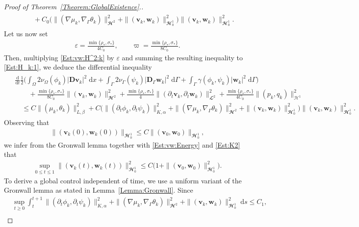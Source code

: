 \documentclass[10pt,reqno]{amsart}
\theoremstyle{remark}
\numberwithin{equation}{section}
\newcommand{\abs}[1]{| #1 |}
\newcommand{\norm}[1]{\| #1 \|}
\newcommand{\bv}{\mathbf{v}}
\newcommand{\bw}{\mathbf{w}}
\newcommand{\D}{\mathbf{D}}
\newcommand{\Dg}{\mathbf{D}_\Gamma}
\newcommand{\intO}{\int_\Omega}
\newcommand{\intG}{\int_\Gamma}
\newcommand{\dx}{\;\mathrm{d}x}
\newcommand{\ds}{\;\mathrm ds}
\newcommand{\dG}{\;\mathrm d\Ga}
\newcommand{\ddt}{\frac{\mathrm d}{\mathrm dt}}
\newcommand{\delt}{\partial_{t}}
\newcommand{\Grad}{\nabla}
\newcommand{\Gradg}{\nabla_\Ga}
\newcommand{\Om}{\Omega}
\newcommand{\Ga}{\Gamma}
\begin{document}
\begin{proof}[Proof of Theorem~\ref{Theorem:GlobalExistence}.]
\begin{align}
\begin{split}
        &\quad + C_0\big(\norm{(\Grad\mu_k,\Gradg\theta_k)}_{\mathbfcal{H}^2}^2 + \norm{(\bv_k,\bw_k)}_{\mathbfcal{H}^1_{0}}^2\big)\norm{(\bv_k,\bw_k)}_{\mathbfcal{H}^1_{0}}^2.
    \end{split}
\end{align}
Let us now set
\begin{align*}
    \varepsilon = \frac{\min\{\rho_\ast,\sigma_\ast\}}{4C_0}, \qquad \varpi = \frac{\min\{\rho_\ast,\sigma_\ast\}}{8C_0}.
\end{align*}
Then, multiplying \eqref{Est:vw:H^2:k} by $\varepsilon$ and summing the resulting inequality to \eqref{Est:H_k:1}, we deduce the differential inequality
\begin{align}\label{Est:H_k:Final}
    \begin{split}
        &\ddt\frac12\Big(\intO 2\nu_\Om(\phi_k)\abs{\D\bv_k}^2\dx + \intG 2\nu_\Ga(\psi_k)\abs{\Dg\bw_k}^2\dG + \intG \gamma(\phi_k,\psi_k)\abs{\bw_k}^2\dG\Big) \\
        &\qquad + \frac{\min\{\rho_\ast,\sigma_\ast\}}{8C_0}\norm{(\bv_k,\bw_k)}_{\mathbfcal{H}^2}^2 + \frac{\min\{\rho_\ast,\sigma_\ast\}}{4}\norm{(\delt\bv_k,\delt\bw_k)}_{\mathbfcal{L}^2}^2 + \frac{\min\{\rho_\ast,\sigma_\ast\}}{4C_0}\norm{(p_k,q_k)}_{\mathcal{H}^1}^2 \\
        &\quad\leq C\norm{(\mu_k,\theta_k)}_{L,\beta}^2 + C\big(\norm{(\delt\phi_k,\delt\psi_k)}_{K,\alpha}^2 + \norm{(\Grad\mu_k,\Gradg\theta_k)}_{\mathbfcal{H}^2}^2 + \norm{(\bv_k,\bw_k)}_{\mathbfcal{H}^1_{0}}^2\big)\norm{(\bv_k,\bw_k)}_{\mathbfcal{H}^1_{0}}^2.
    \end{split}
\end{align}
Observing that
\begin{align*}
    \norm{(\bv_k(0),\bw_k(0))}_{\mathbfcal{H}^1_{0}} \leq C\norm{(\bv_0,\bw_0)}_{\mathbfcal{H}^1_{0}},
\end{align*}
we infer from the Gronwall lemma together with \eqref{Est:vw:Energy} and \eqref{Est:K2} that
\begin{align}\label{Est:vw:H^1:<1}
    \sup_{0\leq t \leq 1}\norm{(\bv_k(t),\bw_k(t))}_{\mathbfcal{H}^1_{0}}^2 \leq C\big(1 + \norm{(\bv_0,\bw_0)}_{\mathbfcal{H}^1_{0}}^2\big).
\end{align}
To derive a global control independent of time, we use a uniform variant of the Gronwall lemma as stated in Lemma~\ref{Lemma:Gronwall}. Since
\begin{align}
    &\sup_{t\geq 0}\int_t^{t+1} \norm{(\delt\phi_k,\delt\psi_k)}_{K,\alpha}^2 + \norm{(\Grad\mu_k,\Gradg\theta_k)}_{\mathbfcal{H}^2}^2 + \norm{(\bv_k,\bw_k)}_{\mathbfcal{H}^1_{0}}^2 \ds \leq C_1, \label{Est:C_1} \\

\end{align}
\end{proof}
\end{document}
